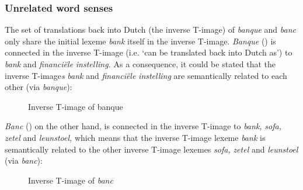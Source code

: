 \subsubsection{Unrelated word senses}
\label{sec:3.4.3.1}
The set of translations back into Dutch (the inverse T-image) of \textit{banque} and \textit{banc} only share the initial lexeme \textit{bank} itself in the inverse T-image. \textit{Banque} () is connected in the inverse T-image (i.e. ‘can be translated back into Dutch as’) to \textit{bank} and \textit{financiële} \textit{instelling.} As a consequence, it could be stated that the inverse T-image\textit{s} \textit{bank} and \textit{financiële} \textit{instelling} are semantically related to each other (via \textit{banque}):

\begin{figure}
\caption{\label{fig:3:10}{Inverse} {T-image} {of} {banque}}
\end{figure}

\textit{Banc} () on the other hand, is connected in the inverse T-image to \textit{bank,} \textit{sofa,} \textit{zetel} and \textit{leunstoel,} which means that the inverse T-image lexeme \textit{bank} is semantically related to the other inverse T-image lexemes \textit{sofa,} \textit{zetel} and \textit{leunstoel} (via \textit{banc}):

\begin{figure}
\caption{\label{fig:3:11}Inverse T-image of \textit{banc}}
\end{figure}

